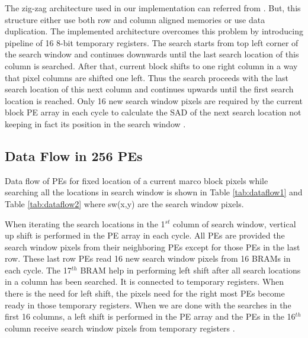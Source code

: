 The zig-zag architecture used in our implementation can referred from \cite{fast_vlsi_architecture}. But, this structure either use both row and column aligned memories or use data duplication. The implemented architecture overcomes this problem by introducing pipeline of 16 8-bit temporary registers. The search starts from top left corner of the search window and continues downwards until the last search location of this column is searched. After that, current block shifts to one right column in a way that pixel columns are shifted one left. Thus the search proceeds with the last search location of this next column and continues upwards until the first search location is reached. Only 16 new search window pixels are required by the current block PE array in each cycle to calculate the SAD of the next search location not keeping in fact its position in the search window \cite{kalaycioglu2011low}.


\subsection{Data Flow in 256 PEs}

Data flow of PEs for fixed location of a current marco block pixels while searching all the locations in search window is shown in Table \ref{tab:dataflow1} and Table \ref{tab:dataflow2} where sw(x,y) are the search window pixels.

When iterating the search locations in the 1$^{st}$ column of search window, vertical up shift is performed in the PE array in each cycle. All PEs are provided the search window pixels from their neighboring PEs except for those PEs in the last row. These last row PEs read 16 new search window pixels from 16 BRAMs in each cycle. The 17$^{th}$ BRAM help in performing left shift after all search locations in a column has been searched. It is connected to temporary registers. When there is the need for left shift, the pixels need for the right most PEs become ready in those temporary registers. When we are done with the searches in the first 16 columns, a left shift is performed in the PE array and the PEs in the 16$^{th}$ column receive search window pixels from temporary registers \cite{kalaycioglu2011low}.

